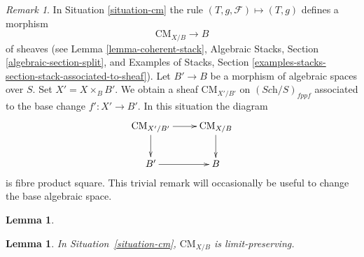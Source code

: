 \documentclass{stacks-project}
\theoremstyle{plain}
\newtheorem{lemma}[subsection]{Lemma}
\theoremstyle{definition}
\theoremstyle{remark}
\newtheorem{remark}[subsection]{Remark}
\numberwithin{equation}{subsection}
\def\Sch{\textit{Sch}}
\def\CMfunctor{\mathcal{C}\!{\it oh}}
\def\CMfunctor{\text{CM}}
\begin{document}
\begin{remark}
	\label{remark-cm-base-change}
	In Situation \ref{situation-cm} the rule
$(T, g, \mathcal{F}) \mapsto (T, g)$ defines a morphism
$$
\CMfunctor_{X/B} \longrightarrow B
$$
of sheaves
(see Lemma \ref{lemma-coherent-stack},
Algebraic Stacks, Section \ref{algebraic-section-split}, and
Examples of Stacks, Section
\ref{examples-stacks-section-stack-associated-to-sheaf}).
Let $B' \to B$ be a morphism of
algebraic spaces over $S$.
Set $X' = X \times_B B'$.
We obtain a sheaf $\CMfunctor_{X'/B'}$ on  $(\Sch/S)_{fppf}$
associated to the base change $f' : X' \to B'$. In this situation
the diagram
$$
\vcenter{
\xymatrix{
\CMfunctor_{X'/B'} \ar[r] \ar[d] & \CMfunctor_{X/B} \ar[d] \\
B' \ar[r] & B
}
}
$$
is fibre product square. This trivial remark
will occasionally be useful to change the base algebraic space.
\end{remark}
\begin{lemma}
	
	\label{lemma-sm-stack}
\end{lemma}
\begin{lemma}
    In Situation~\ref{situation-cm}, $\CMfunctor_{X/B}$ is limit-preserving.
	\label{lemma-cm-limits}
\end{lemma}
\end{document}
